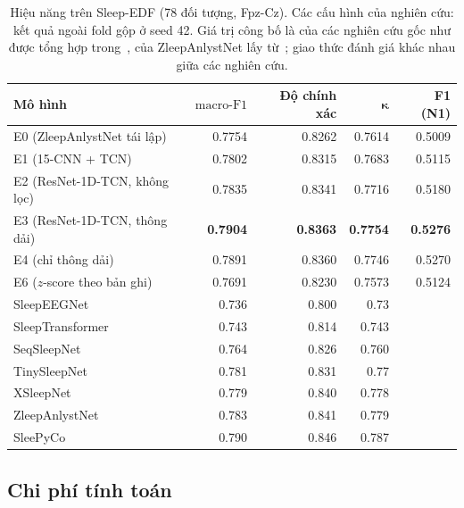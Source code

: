\documentclass[11pt,a4paper]{article}
\newcommand{\mf}{\ensuremath{\mathrm{macro\text{-}F1}}}
\begin{document}
\begin{table}[H]
\centering
\caption{Hiệu năng trên Sleep-EDF (78 đối tượng, Fpz-Cz). Các cấu hình của nghiên cứu: kết quả ngoài fold gộp ở
seed 42. Giá trị công bố là của các nghiên cứu gốc như được tổng hợp trong~\cite{lee2024sleepyco}, của
ZleepAnlystNet lấy từ~\cite{jadhav2024zleepanlystnet}; giao thức đánh giá khác nhau giữa các nghiên cứu.}
\label{tab:sleepedf-performance}
\small
\begin{tabular}{lrrrr}
\toprule
\textbf{Mô hình} & \textbf{\mf} & \textbf{Độ chính xác} & $\boldsymbol{\kappa}$ & \textbf{F1 (N1)} \\
\midrule
E0 (ZleepAnlystNet tái lập)     & 0.7754 & 0.8262 & 0.7614 & 0.5009 \\
E1 (15-CNN + TCN)               & 0.7802 & 0.8315 & 0.7683 & 0.5115 \\
E2 (ResNet-1D-TCN, không lọc)   & 0.7835 & 0.8341 & 0.7716 & 0.5180 \\
E3 (ResNet-1D-TCN, thông dải)   & \textbf{0.7904} & \textbf{0.8363} & \textbf{0.7754} & \textbf{0.5276} \\
E4 (chỉ thông dải)              & 0.7891 & 0.8360 & 0.7746 & 0.5270 \\
E6 ($z$-score theo bản ghi)     & 0.7691 & 0.8230 & 0.7573 & 0.5124 \\
\midrule
SleepEEGNet~\cite{mousavi2019sleepeegnet} & 0.736 & 0.800 & 0.73 & \\
SleepTransformer~\cite{phan2022sleeptransformer} & 0.743 & 0.814 & 0.743 & \\
SeqSleepNet~\cite{phan2019seqsleepnet} & 0.764 & 0.826 & 0.760 & \\
TinySleepNet~\cite{supratak2020tinysleepnet} & 0.781 & 0.831 & 0.77 & \\
XSleepNet~\cite{phan2022xsleepnet} & 0.779 & 0.840 & 0.778 & \\
ZleepAnlystNet~\cite{jadhav2024zleepanlystnet} & 0.783 & 0.841 & 0.779 & \\
SleePyCo~\cite{lee2024sleepyco} & 0.790 & 0.846 & 0.787 & \\
\bottomrule
\end{tabular}
\end{table}

\subsection{Chi phí tính toán}
\end{document}
